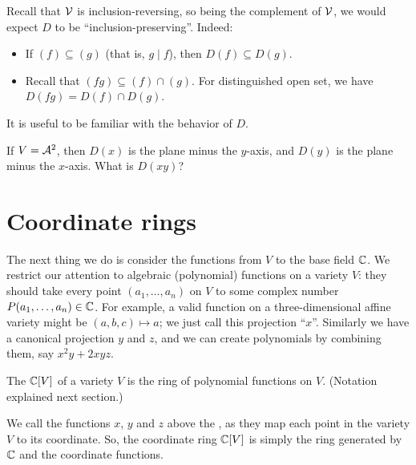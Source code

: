 \begin{proposition}
	Recall that $\VV$ is inclusion-reversing, so being the complement of $\VV$,
	we would expect $D$ to be ``inclusion-preserving''. Indeed:
	\begin{itemize}
		\item If $(f) \subseteq (g)$ (that is, $g \mid f$), then $D(f) \subseteq
			D(g)$.
		\item Recall that $(fg) \subseteq(f) \cap(g)$. For distinguished open
			set, we have $D(fg) = D(f) \cap D(g)$.
	\end{itemize}
\end{proposition}

It is useful to be familiar with the behavior of $D$.
\begin{ques}
	If $V=\AA^2$, then $D(x)$ is the plane minus the $y$-axis, and
	$D(y)$ is the plane minus the $x$-axis. What is $D(xy)$?
\end{ques}





\section{Coordinate rings}

The next thing we do is consider the functions from $V$ to the base field $\CC$.
We restrict our attention to algebraic (polynomial) functions on a variety $V$:
they should take every point $(a_1, \dots, a_n)$ on $V$ to some complex number $P(a_1, \dots, a_n) \in \CC$.
For example, a valid function on a three-dimensional affine variety might be $(a,b,c) \mapsto a$;
we just call this projection ``$x$''.
Similarly we have a canonical projection $y$ and $z$,
and we can create polynomials by combining them,
say $x^2y + 2xyz$.

\begin{definition}
	The  $\CC[V]$ of a variety $V$
	is the ring of polynomial functions on $V$.
	(Notation explained next section.)
\end{definition}

\begin{remark}
	\label{remark:meaning_name_coordinate_ring}
	We call the functions $x$, $y$ and $z$ above the , as they map each point in the variety $V$ to its coordinate.
	So, the coordinate ring $\CC[V]$ is simply the ring generated by $\CC$ and
	the coordinate functions.
\end{remark}

